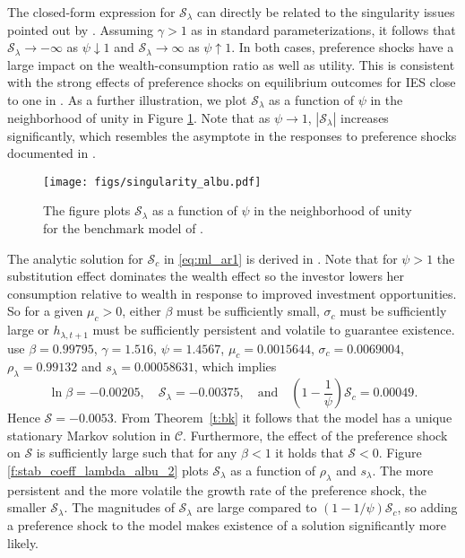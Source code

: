 \documentclass[12pt, reqno]{amsart}
\newcommand{\1}{\mathbbm 1}
\newcommand{\cC}{\mathscr C}
\newcommand{\sS}{\mathscr S}
\theoremstyle{plain}
\theoremstyle{definition}
\begin{document}
The closed-form expression for $\sS_\lambda$ can directly be related to the
singularity issues pointed out by \cite{deGroot2018}. Assuming $\gamma > 1$
as in standard parameterizations, it follows that $\sS_\lambda \to -\infty$
as $\psi \downarrow 1$ and $\sS_\lambda \to \infty$ as $\psi \uparrow 1$. In
both cases, preference shocks have a large impact on the wealth-consumption
ratio as well as utility. This is consistent with the strong effects of
preference shocks on equilibrium outcomes for IES close to one in
\cite{deGroot2018}. As a further illustration, we plot $\sS_\lambda$ as a
function of $\psi$ in the neighborhood of unity in Figure
\ref{f:singularity_albu}. Note that as $\psi \to 1$, $|\sS_\lambda|$
increases significantly, which resembles the asymptote in the responses to
preference shocks documented in \cite{deGroot2018}.

\begin{figure}
	\centering
	\texttt{[image: figs/singularity\_albu.pdf]}
    \caption{The figure plots $\sS_\lambda$ as a function of $\psi$ in the
    neighborhood of unity for the benchmark model of \cite{Albuquerque2016}.}\label{f:singularity_albu}
\end{figure}


The analytic solution for $\sS_c$ in \eqref{eq:ml_ar1} is derived in
\cite{borovicka2020necessary}.  Note that for $\psi>1$  the substitution
effect dominates the wealth effect so the investor lowers her consumption
relative to wealth in response to improved investment opportunities. So for a
given $\mu_c > 0$, either $\beta$ must be sufficiently small, $\sigma_{c}$
must be sufficiently large or $h_{\lambda, t+1}$ must be sufficiently
persistent and volatile to guarantee existence.  \cite{Albuquerque2016} use
$\beta = 0.99795$, $\gamma = 1.516$, $\psi =
1.4567$, $\mu_c = 0.0015644$, $\sigma_c = 0.0069004$, $\rho_\lambda = 0.99132$
  and $s_\lambda = 0.00058631$, which implies
%
\begin{equation*}
	\ln \beta  = -0.00205,
    \quad
	\sS_\lambda  =  -0.00375,
    \quad \text{and} \quad
	\left(1-\frac{1}{\psi}\right) \sS_c = 0.00049.
\end{equation*}
%
Hence $\sS = -0.0053$.  From Theorem~\ref{t:bk} it follows that the model has a unique stationary
Markov solution in $\cC$.  Furthermore, the effect of the preference shock on
$\sS$ is sufficiently large such that for any  $\beta< 1$ it holds that $\sS
< 0$.  Figure \ref{f:stab_coeff_lambda_albu_2} plots  $\sS_\lambda$  as a
function of $\rho_\lambda $ and $s_\lambda$. The more persistent and the more
volatile the growth rate of the preference shock, the smaller  $\sS_\lambda$.
The magnitudes of $\sS_\lambda$ are large compared to
$\left(1-1/\psi\right) \sS_c$, so adding a preference shock to the
model makes existence of a solution significantly more likely. 
\end{document}
